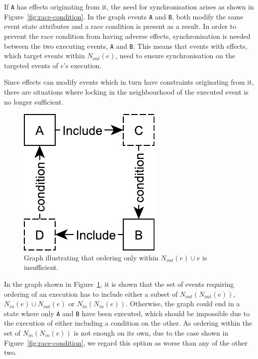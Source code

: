 \documentclass{article}
\begin{document}
	If \texttt{A} has effects originating from it, the need for synchronisation arises as shown in Figure~\ref{fig:race-condition}.
	In the graph events \texttt{A} and \texttt{B}, both modify the same event state attributes and a race condition is present as a result.
	In order to prevent the race condition from having adverse effects, synchronisation is needed between the two executing events, \texttt{A} and \texttt{B}.
	This means that events with effects, which target events within $N_{out}(e)$, need to ensure synchronisation on the targeted events of $e$'s execution.

	Since effects can modify events which in turn have constraints originating from it, there are situations where locking in the neighbourhood of the executed event is no longer sufficient.

	\begin{figure}[ht]
		\center
		\includegraphics[scale=0.5]{figures/dcr-graphs/second-degree-effect.pdf}
		\caption{Graph illustrating that ordering only within $N_{out}(e) \cup e$ is insufficient.}
		\label{fig:second-degree-effect}
	\end{figure}
	\FloatBarrier

	In the graph shown in Figure~\ref{fig:second-degree-effect}, it is shown that the set of events requiring ordering of an execution has to include either a subset of $N_{out}(N_{out}(e))$, $N_{in}(e) \cup N_{out}(e)$ or $N_{in}(N_{in}(e))$.
	Otherwise, the graph could end in a state where only \texttt{A} and \texttt{B} have been executed, which should be impossible due to the execution of either including a condition on the other.
	As ordering within the set of $N_{in}(N_{in}(e))$ is not enough on its own, due to the case shown in Figure~\ref{fig:race-condition}, we regard this option as worse than any of the other two.
\end{document}
